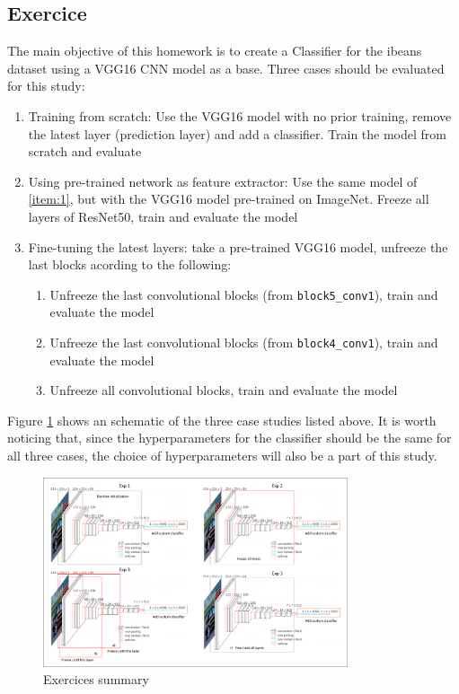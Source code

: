 \documentclass[10pt, a4paper]{article}
\begin{document}
\subsection{Exercice}

The main objective of this homework is to create a Classifier for the ibeans dataset using a VGG16 CNN model as a base. Three cases should be evaluated
for this study:

\begin{enumerate}
  \item Training from scratch: Use the VGG16 model with no prior training, remove the latest layer (prediction layer) and add a classifier. Train the model from scratch and evaluate\label{item:1}
  \item Using pre-trained network as feature extractor: Use the same model of \ref{item:1}, but with the VGG16 model pre-trained on ImageNet. Freeze all layers of ResNet50, train and evaluate the model\label{item:2}
  \item Fine-tuning the latest layers: take a pre-trained VGG16 model, unfreeze the last blocks acording to the following:\label{item:3}
  \begin{enumerate}[a]
    \item Unfreeze the last convolutional blocks (from {\tt block5\_conv1}), train and evaluate the model\label{item:3a}
    \item Unfreeze the last convolutional blocks (from {\tt block4\_conv1}), train and evaluate the model\label{item:3b}
    \item Unfreeze all convolutional blocks, train and evaluate the model\label{item:3c}
  \end{enumerate}
\end{enumerate}

Figure \ref{fig:exercice} shows an schematic of the three case studies listed above. It is worth noticing that, since the hyperparameters for the classifier should be
the same for all three cases, the choice of hyperparameters will also be a part of this study.

\begin{figure}[htpb]
  \centering
  \includegraphics[width=0.8\textwidth]{images/exercice.png}
  \caption{Exercices summary}
  \label{fig:exercice}
\end{figure}
\end{document}

